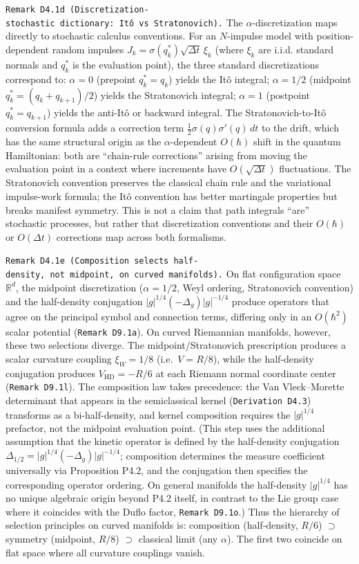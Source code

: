 \documentclass[
]{article}
\begin{document}
\texttt{Remark\ D4.1d\ (Discretization-stochastic\ dictionary:\ Itô\ vs\ Stratonovich).}
The \(\alpha\)-discretization maps directly to stochastic calculus
conventions. For an \(N\)-impulse model with position-dependent random
impulses \(J_k=\sigma(q_k^\ast)\sqrt{\Delta t}\,\xi_k\) (where \(\xi_k\)
are i.i.d. standard normals and \(q_k^\ast\) is the evaluation point),
the three standard discretizations correspond to: \(\alpha=0\) (prepoint
\(q_k^\ast=q_k\)) yields the Itô integral; \(\alpha=1/2\) (midpoint
\(q_k^\ast=(q_k+q_{k+1})/2\)) yields the Stratonovich integral;
\(\alpha=1\) (postpoint \(q_k^\ast=q_{k+1}\)) yields the anti-Itô or
backward integral. The Stratonovich-to-Itô conversion formula adds a
correction term \(\tfrac12\sigma(q)\sigma'(q)\,dt\) to the drift, which
has the same structural origin as the \(\alpha\)-dependent \(O(\hbar)\)
shift in the quantum Hamiltonian: both are ``chain-rule corrections''
arising from moving the evaluation point in a context where increments
have \(O(\sqrt{\Delta t})\) fluctuations. The Stratonovich convention
preserves the classical chain rule and the variational impulse-work
formula; the Itô convention has better martingale properties but breaks
manifest symmetry. This is not a claim that path integrals ``are''
stochastic processes, but rather that discretization conventions and
their \(O(\hbar)\) or \(O(\Delta t)\) corrections map across both
formalisms.

\texttt{Remark\ D4.1e\ (Composition\ selects\ half-density,\ not\ midpoint,\ on\ curved\ manifolds).}
On flat configuration space \(\mathbb{R}^d\), the midpoint
discretization (\(\alpha=1/2\), Weyl ordering, Stratonovich convention)
and the half-density conjugation \(|g|^{1/4}(-\Delta_g)|g|^{-1/4}\)
produce operators that agree on the principal symbol and connection
terms, differing only in an \(O(\hbar^2)\) scalar potential
(\texttt{Remark\ D9.1a}). On curved Riemannian manifolds, however, these
two selections diverge. The midpoint/Stratonovich prescription produces
a scalar curvature coupling \(\xi_W = 1/8\) (i.e.~\(V = R/8\)), while
the half-density conjugation produces \(V_{\mathrm{HD}} = -R/6\) at each
Riemann normal coordinate center (\texttt{Remark\ D9.1l}). The
composition law takes precedence: the Van Vleck--Morette determinant
that appears in the semiclassical kernel (\texttt{Derivation\ D4.3})
transforms as a bi-half-density, and kernel composition requires the
\(|g|^{1/4}\) prefactor, not the midpoint evaluation point. (This step
uses the additional assumption that the kinetic operator is defined by
the half-density conjugation
\(\Delta_{1/2}=|g|^{1/4}(-\Delta_g)|g|^{-1/4}\); composition determines
the measure coefficient universally via Proposition P4.2, and the
conjugation then specifies the corresponding operator ordering. On
general manifolds the half-density \(|g|^{1/4}\) has no unique algebraic
origin beyond P4.2 itself, in contrast to the Lie group case where it
coincides with the Duflo factor,
\texttt{Remark\ D9.1o\textquotesingle{}}.) Thus the hierarchy of
selection principles on curved manifolds is: composition (half-density,
\(R/6\)) \(\supset\) symmetry (midpoint, \(R/8\)) \(\supset\) classical
limit (any \(\alpha\)). The first two coincide on flat space where all
curvature couplings vanish.
\end{document}
